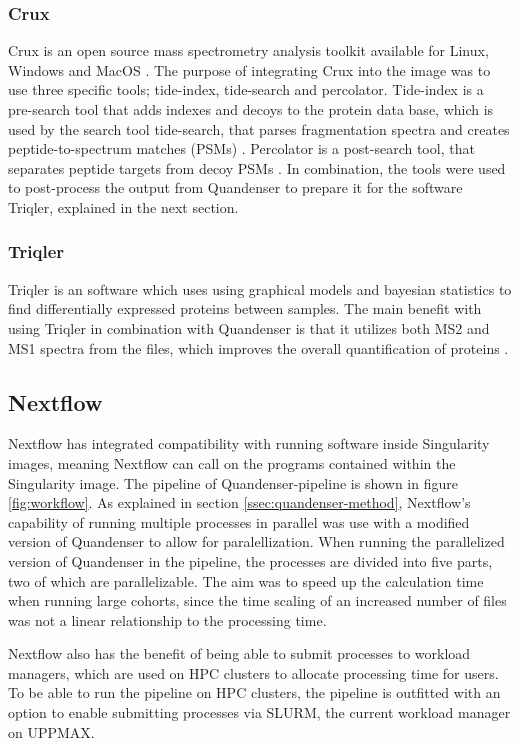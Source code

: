 \subsubsection{Crux}
Crux is an open source mass spectrometry analysis toolkit available for Linux, Windows and MacOS \cite{crux}. The purpose of integrating Crux into the image was to use three specific tools; tide-index, tide-search and percolator. Tide-index is a pre-search tool that adds indexes and decoys to the protein data base, which is used by the search tool tide-search, that parses fragmentation spectra and creates peptide-to-spectrum matches (PSMs) \cite{tide-search}. Percolator is a post-search tool, that separates peptide targets from decoy PSMs \cite{percolator}. In combination, the tools were used to post-process the output from Quandenser to prepare it for the software Triqler, explained in the next section.

\subsubsection{Triqler}
Triqler is an software which uses using graphical models and bayesian statistics to find differentially expressed proteins between samples. The main benefit with using Triqler in combination with Quandenser is that it utilizes both MS2 and MS1 spectra from the files, which improves the overall quantification of proteins \cite{triqler}.


\subsection{Nextflow}
Nextflow has integrated compatibility with running software inside Singularity images, meaning Nextflow can call on the programs contained within the Singularity image. The pipeline of Quandenser-pipeline is shown in figure \ref{fig:workflow}. As explained in section \ref{ssec:quandenser-method}, Nextflow's capability of running multiple processes in parallel was use with a modified version of Quandenser to allow for paralellization. When running the parallelized version of Quandenser in the pipeline, the processes are divided into five parts, two of which are parallelizable. The aim was to speed up the calculation time when running large cohorts, since the time scaling of an increased number of files was not a linear relationship to the processing time.

Nextflow also has the benefit of being able to submit processes to workload managers, which are used on HPC clusters to allocate processing time for users. To be able to run the pipeline on HPC clusters, the pipeline is outfitted with an option to enable submitting processes via SLURM, the current workload manager on UPPMAX.

